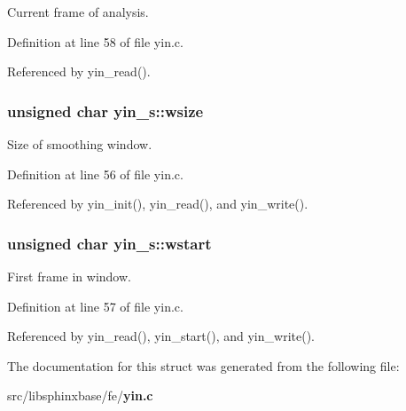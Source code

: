 \-Current frame of analysis. 



\-Definition at line 58 of file yin.\-c.



\-Referenced by yin\-\_\-read().

\subsubsection[{wsize}]{\setlength{\rightskip}{0pt plus 5cm}unsigned char {\bf yin\-\_\-s\-::wsize}}\label{structyin__s_a024d8e9d70f94a7f62457154fb5a4b03}


\-Size of smoothing window. 



\-Definition at line 56 of file yin.\-c.



\-Referenced by yin\-\_\-init(), yin\-\_\-read(), and yin\-\_\-write().

\subsubsection[{wstart}]{\setlength{\rightskip}{0pt plus 5cm}unsigned char {\bf yin\-\_\-s\-::wstart}}\label{structyin__s_a18481851da6db4df2a469b80c2c5704e}


\-First frame in window. 



\-Definition at line 57 of file yin.\-c.



\-Referenced by yin\-\_\-read(), yin\-\_\-start(), and yin\-\_\-write().



\-The documentation for this struct was generated from the following file\-:\begin{DoxyCompactItemize}
\item 
src/libsphinxbase/fe/{\bf yin.\-c}\end{DoxyCompactItemize}
